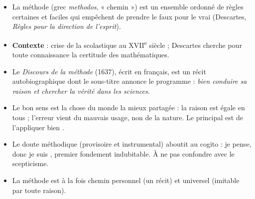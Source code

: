\documentclass[11pt]{article}
\newcommand{\cle}[1]{{\popxbold\color{popdark}#1}}
\begin{document}
\begin{aretenir}
\begin{itemize}
\item La \cle{méthode} (grec \emph{methodos}, « chemin ») est un ensemble ordonné de règles certaines et faciles qui empêchent de prendre le faux pour le vrai (Descartes, \emph{Règles pour la direction de l'esprit}).
\item \textbf{Contexte} : crise de la scolastique au XVII\textsuperscript{e} siècle ; Descartes cherche pour toute connaissance la certitude des mathématiques.
\item Le \emph{Discours de la méthode} (1637), écrit en français, est un récit autobiographique dont le sous-titre annonce le programme : \emph{bien conduire sa raison et chercher la vérité dans les sciences}.
\item Le \cle{bon sens} est \guillemotleft la chose du monde la mieux partagée \guillemotright : la raison est égale en tous ; l'erreur vient du mauvais usage, non de la nature. \guillemotleft Le principal est de l'appliquer bien \guillemotright.
\item Le \cle{doute méthodique} (provisoire et instrumental) aboutit au cogito : \guillemotleft je pense, donc je suis \guillemotright, premier fondement indubitable. À ne pas confondre avec le scepticisme.
\item La méthode est à la fois chemin personnel (un récit) et universel (imitable par toute raison).
\end{itemize}
\end{aretenir}
\end{document}
